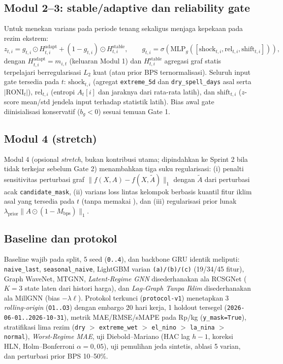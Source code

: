 \documentclass[11pt,a4paper]{article}
\begin{document}
\subsection{Modul 2--3: stable/adaptive dan reliability gate}
Untuk menekan varians pada periode tenang sekaligus menjaga kepekaan pada rezim ekstrem:
\begin{equation}
z_{t,i} = g_{t,i} \odot H^{\mathrm{adapt}}_{t,i} + (1 - g_{t,i})\odot H^{\mathrm{stable}}_{t,i},
\qquad
g_{t,i} = \sigma\left(\mathrm{MLP}_g([\text{shock}_{t,i},\text{rel}_{t,i},\text{shift}_{t,i}])\right),
\end{equation}
dengan $H^{\mathrm{adapt}}_{t,i} = m_{i,t}$ (keluaran Modul 1) dan $H^{\mathrm{stable}}_{t,i}$
agregasi graf statis terpelajari berregularisasi $L_2$ kuat (atau prior BPS ternormalisasi).
Seluruh input gate tersedia pada $t$: $\text{shock}_{t,i}$ (agregat \texttt{extreme\_5d} dan
\texttt{dry\_spell\_days} asal serta $|\text{RONI}_t|$), $\text{rel}_{t,i}$ (entropi $A_t[i]$
dan jaraknya dari rata-rata latih), dan $\text{shift}_{t,i}$ ($z$-score mean/std jendela input
terhadap statistik latih). Bias awal gate diinisialisasi konservatif ($b_g < 0$) sesuai temuan
Gate 1.

\subsection{Modul 4 (stretch)}
Modul 4 (opsional \textit{stretch}, bukan kontribusi utama; dipindahkan ke Sprint 2 bila tidak
terkejar sebelum Gate 2) menambahkan tiga suku regularisasi: (i) penalti sensitivitas perturbasi
graf $\|f(X,A)-f(X,\tilde{A})\|_1$ dengan $\tilde{A}$ dari perturbasi acak \texttt{candidate\_mask},
(ii) varians loss lintas kelompok berbasis kuantil fitur iklim asal yang tersedia pada $t$ (tanpa
memakai ), dan (iii) regularisasi prior lunak
$\lambda_{\text{prior}}\|A \odot (1 - M_{\text{bps}})\|_1$.

\subsection{Baseline dan protokol}
Baseline wajib pada split, 5 seed (\texttt{0..4}), dan backbone GRU identik meliputi:
\texttt{naive\_last}, \texttt{seasonal\_naive}, LightGBM varian \texttt{(a)/(b)/(c)} (19/34/45
fitur), Graph WaveNet, MTGNN, \textit{Latent-Regime GNN} disederhanakan ala RCSGNet ($K=3$
state laten dari histori harga), dan \textit{Lag-Graph Tanpa Iklim} disederhanakan ala MillGNN
(bias $-\lambda\ell$). Protokol terkunci  (\texttt{protocol-v1})
menetapkan 3 \textit{rolling-origin} (\texttt{O1..O3}) dengan embargo 20 hari kerja, 1 holdout
tersegel (\texttt{2026-06-01..2026-10-31}), metrik MAE/RMSE/sMAPE pada Rp/kg (\texttt{y\_mask=True}),
stratifikasi lima rezim (\texttt{dry} $>$ \texttt{extreme\_wet} $>$ \texttt{el\_nino} $>$
\texttt{la\_nina} $>$ \texttt{normal}), \textit{Worst-Regime MAE}, uji Diebold--Mariano
(HAC lag $h-1$, koreksi HLN, Holm--Bonferroni $\alpha=0{,}05$), uji pemulihan jeda sintetis,
ablasi 5 varian, dan perturbasi prior BPS 10--50\%.
\end{document}
